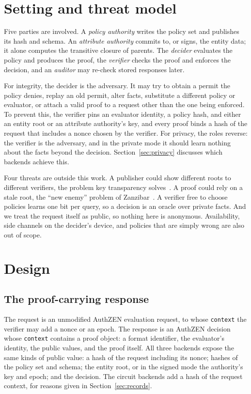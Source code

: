 \documentclass[11pt]{article}
\begin{document}
\section{Setting and threat model}
\label{sec:threat}

Five parties are involved. A \emph{policy authority} writes the policy set and publishes its hash and schema. An \emph{attribute authority} commits to, or signs, the entity data; it alone computes the transitive closure of parents. The \emph{decider} evaluates the policy and produces the proof, the \emph{verifier} checks the proof and enforces the decision, and an \emph{auditor} may re-check stored responses later.

For integrity, the decider is the adversary. It may try to obtain a permit the policy denies, replay an old permit, alter facts, substitute a different policy or evaluator, or attach a valid proof to a request other than the one being enforced. To prevent this, the verifier pins an evaluator identity, a policy hash, and either an entity root or an attribute authority's key, and every proof binds a hash of the request that includes a nonce chosen by the verifier. For privacy, the roles reverse: the verifier is the adversary, and in the private mode it should learn nothing about the facts beyond the decision. Section~\ref{sec:privacy} discusses which backends achieve this.

Four threats are outside this work. A publisher could show different roots to different verifiers, the problem key transparency solves~\citep{melara2015coniks}. A proof could rely on a stale root, the ``new enemy'' problem of Zanzibar~\citep{pang2019zanzibar}. A verifier free to choose policies learns one bit per query, so a decision is an oracle over private facts. And we treat the request itself as public, so nothing here is anonymous. Availability, side channels on the decider's device, and policies that are simply wrong are also out of scope.

\section{Design}

\subsection{The proof-carrying response}
\label{sec:protocol}

The request is an unmodified AuthZEN evaluation request, to whose \texttt{context} the verifier may add a nonce or an epoch. The response is an AuthZEN decision whose \texttt{context} contains a proof object: a format identifier, the evaluator's identity, the public values, and the proof itself. All three backends expose the same kinds of public value: a hash of the request including its nonce; hashes of the policy set and schema; the entity root, or in the signed mode the authority's key and epoch; and the decision. The circuit backends add a hash of the request context, for reasons given in Section~\ref{sec:records}.
\end{document}

